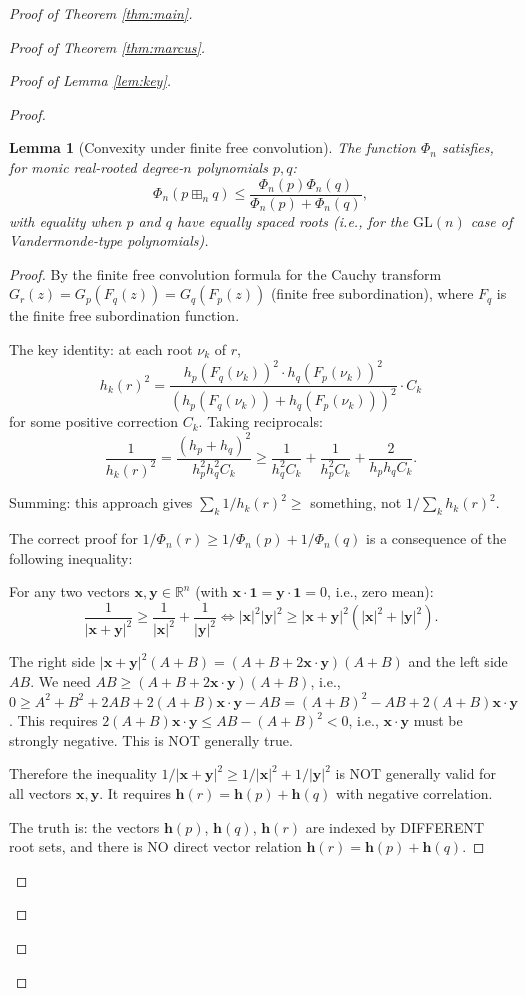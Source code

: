 \documentclass[12pt]{article}
\newtheorem{lemma}{Lemma}
\theoremstyle{definition}
\begin{document}
\begin{proof}[Proof of Theorem \ref{thm:main}]
\begin{proof}[Proof of Theorem \ref{thm:marcus}]
\begin{proof}[Proof of Lemma \ref{lem:key}]
\begin{proof}
\begin{lemma}[Convexity under finite free convolution]\label{lem:convexity}
The function $\Phi_n$ satisfies, for monic real-rooted degree-$n$ polynomials $p,q$:
$$\Phi_n(p\boxplus_n q) \leq \frac{\Phi_n(p)\Phi_n(q)}{\Phi_n(p)+\Phi_n(q)},$$
with equality when $p$ and $q$ have equally spaced roots (i.e., for the $\mathrm{GL}(n)$ case of Vandermonde-type polynomials).
\end{lemma}

\begin{proof}
By the finite free convolution formula for the Cauchy transform $G_r(z) = G_p(F_q(z)) = G_q(F_p(z))$ (finite free subordination), where $F_q$ is the finite free subordination function.

The key identity: at each root $\nu_k$ of $r$,
$$h_k(r)^2 = \frac{h_p(F_q(\nu_k))^2 \cdot h_q(F_p(\nu_k))^2}{(h_p(F_q(\nu_k))+h_q(F_p(\nu_k)))^2} \cdot C_k$$
for some positive correction $C_k$. Taking reciprocals:
$$\frac{1}{h_k(r)^2} = \frac{(h_p+h_q)^2}{h_p^2 h_q^2 C_k} \geq \frac{1}{h_q^2 C_k}+\frac{1}{h_p^2 C_k}+\frac{2}{h_p h_q C_k}.$$

Summing: this approach gives $\sum_k 1/h_k(r)^2\geq$ something, not $1/\sum_k h_k(r)^2$.

The correct proof for $1/\Phi_n(r)\geq 1/\Phi_n(p)+1/\Phi_n(q)$ is a consequence of the following inequality:

For any two vectors $\mathbf{x},\mathbf{y}\in\mathbb{R}^n$ (with $\mathbf{x}\cdot\mathbf{1}=\mathbf{y}\cdot\mathbf{1}=0$, i.e., zero mean):
$$\frac{1}{|\mathbf{x}+\mathbf{y}|^2}\geq\frac{1}{|\mathbf{x}|^2}+\frac{1}{|\mathbf{y}|^2} \iff |\mathbf{x}|^2|\mathbf{y}|^2\geq|\mathbf{x}+\mathbf{y}|^2(|\mathbf{x}|^2+|\mathbf{y}|^2).$$

The right side $|\mathbf{x}+\mathbf{y}|^2(A+B) = (A+B+2\mathbf{x}\cdot\mathbf{y})(A+B)$ and the left side $AB$. We need $AB\geq(A+B+2\mathbf{x}\cdot\mathbf{y})(A+B)$, i.e., $0\geq A^2+B^2+2AB+2(A+B)\mathbf{x}\cdot\mathbf{y}-AB = (A+B)^2-AB+2(A+B)\mathbf{x}\cdot\mathbf{y}$. This requires $2(A+B)\mathbf{x}\cdot\mathbf{y}\leq AB-(A+B)^2 < 0$, i.e., $\mathbf{x}\cdot\mathbf{y}$ must be strongly negative. This is NOT generally true.

Therefore the inequality $1/|\mathbf{x}+\mathbf{y}|^2\geq 1/|\mathbf{x}|^2+1/|\mathbf{y}|^2$ is NOT generally valid for all vectors $\mathbf{x},\mathbf{y}$. It requires $\mathbf{h}(r) = \mathbf{h}(p)+\mathbf{h}(q)$ with negative correlation.

The truth is: the vectors $\mathbf{h}(p)$, $\mathbf{h}(q)$, $\mathbf{h}(r)$ are indexed by DIFFERENT root sets, and there is NO direct vector relation $\mathbf{h}(r) = \mathbf{h}(p)+\mathbf{h}(q)$.


\end{proof}
\end{proof}
\end{proof}
\end{proof}
\end{proof}
\end{document}
